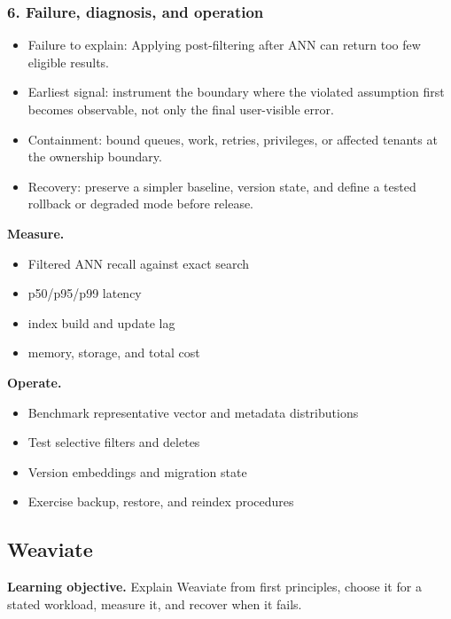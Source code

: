 \subsubsection*{6. Failure, diagnosis, and operation}
\begin{itemize}
\item Failure to explain: Applying post-filtering after ANN can return too few eligible results.
\item Earliest signal: instrument the boundary where the violated assumption first becomes observable, not only the final user-visible error.
\item Containment: bound queues, work, retries, privileges, or affected tenants at the ownership boundary.
\item Recovery: preserve a simpler baseline, version state, and define a tested rollback or degraded mode before release.
\end{itemize}
\textbf{Measure.}\begin{itemize}
\item Filtered ANN recall against exact search
\item p50/p95/p99 latency
\item index build and update lag
\item memory, storage, and total cost
\end{itemize}
\textbf{Operate.}\begin{itemize}
\item Benchmark representative vector and metadata distributions
\item Test selective filters and deletes
\item Version embeddings and migration state
\item Exercise backup, restore, and reindex procedures
\end{itemize}
\subsection{Weaviate}
\textbf{Learning objective.} Explain Weaviate from first principles, choose it for a stated workload, measure it, and recover when it fails.
